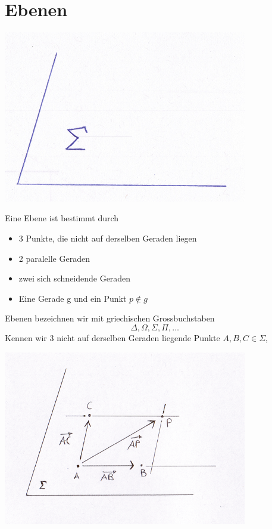 \section{Ebenen}
\begin{center}
	 \includegraphics[width=0.8\textwidth]{imgs/ebenen.png}
 \end{center}
Eine Ebene ist bestimmt durch 
\begin{itemize}
	\item
	3 Punkte, die nicht auf derselben Geraden liegen
	\item
	2 paralelle Geraden
	\item
	zwei sich schneidende Geraden
	\item
	Eine Gerade g und ein Punkt $p \not \in g$
\end{itemize}
Ebenen bezeichnen wir mit griechischen Grossbuchstaben
\begin{equation*}
	\Delta,\Omega,\Sigma,\Pi, \ldots
\end{equation*}
Kennen wir 3 nicht auf derselben Geraden liegende Punkte $A,B,C \in \Sigma$,
\begin{center}
	 \includegraphics[width=0.8\textwidth]{imgs/ebenen_beispiel1.png}
 \end{center}

